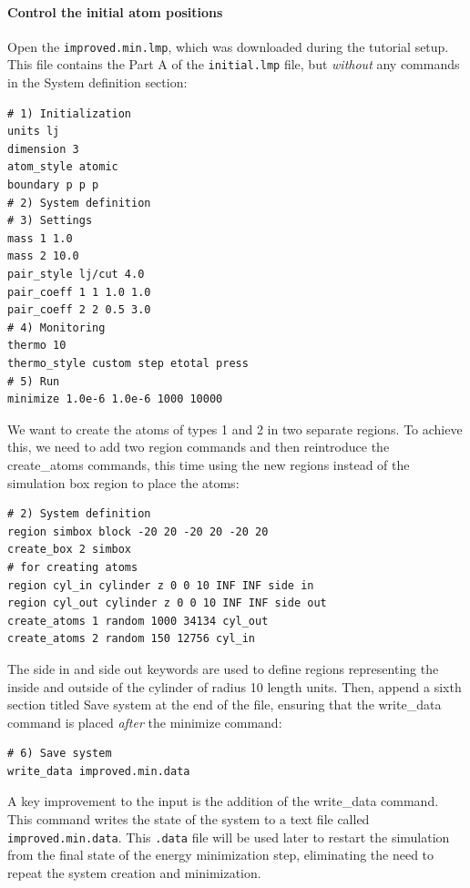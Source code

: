 \documentclass[9pt,tutorial]{livecoms}
\newcommand{\lmpcmd}[1]{\hspace{0pt}\colorbox{listing}{\textcolor{command}{\small{#1}}}\hspace{0pt}} %
\newcommand{\flecmd}[1]{\textcolor{command}{\texttt{#1}}} %
\begin{document}
\paragraph{Control the initial atom positions}

Open the \flecmd{improved.min.lmp}, which was downloaded during the
tutorial setup.  This file contains the \lmpcmd{Part A} of the
\flecmd{initial.lmp} file, but \emph{without} any
commands in the \lmpcmd{System definition} section:
\begin{lstlisting}
# 1) Initialization
units lj
dimension 3
atom_style atomic
boundary p p p
# 2) System definition
# 3) Settings
mass 1 1.0
mass 2 10.0
pair_style lj/cut 4.0
pair_coeff 1 1 1.0 1.0
pair_coeff 2 2 0.5 3.0
# 4) Monitoring
thermo 10
thermo_style custom step etotal press
# 5) Run
minimize 1.0e-6 1.0e-6 1000 10000
\end{lstlisting}

We want to create the atoms of types 1 and 2 in two separate
regions.  To achieve this, we need to add two \lmpcmd{region} commands and then
reintroduce the \lmpcmd{create\_atoms} commands, this time using the new
regions instead of the simulation box region to place the atoms:
\begin{lstlisting}
# 2) System definition
region simbox block -20 20 -20 20 -20 20
create_box 2 simbox
# for creating atoms
region cyl_in cylinder z 0 0 10 INF INF side in
region cyl_out cylinder z 0 0 10 INF INF side out
create_atoms 1 random 1000 34134 cyl_out
create_atoms 2 random 150 12756 cyl_in
\end{lstlisting}
The \lmpcmd{side in} and \lmpcmd{side out} keywords are used to define
regions representing the inside and outside of the cylinder of radius
10 length units.  Then, append a sixth section titled \lmpcmd{Save system} at the end
of the file, ensuring that the \lmpcmd{write\_data} command is placed \emph{after}
the \lmpcmd{minimize} command:
\begin{lstlisting}
# 6) Save system
write_data improved.min.data
\end{lstlisting}

\begin{note}
  A key improvement to the input is the addition of the
  \lmpcmd{write\_data} command.  This command writes the state of the
  system to a text file called \flecmd{improved.min.data}.  This
  \flecmd{.data} file will be used later to restart the simulation from
  the final state of the energy minimization step, eliminating the need
  to repeat the system creation and minimization.
\end{note}
\end{document}

